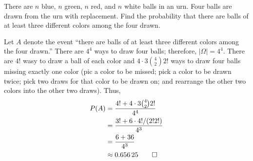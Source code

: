 \begin{problem}[Handout 2, \# 19]
  There are \(n\) blue, \(n\) green, \(n\) red, and \(n\) white balls in an
  urn. Four balls are drawn from the urn with replacement. Find the
  probability that there are balls of at least three different colors among
  the four drawn.
\end{problem}
\begin{solution*}
  Let \(A\) denote the event ``there are balls of at least three different
  colors among the four drawn.'' There are \(4^4\) ways to draw four balls;
  therefore, \(|\Omega|=4^4\). There are \(4!\) wasy to draw a ball of each
  color and \(4\cdot 3\binom{4}{2} 2!\) ways to draw four balls missing
  exactly one color (pic a color to be missed; pick a color to be drawn
  twice; pick two draws for that color to be drawn on; and rearrange the
  other two colors into the other two draws). Thus,
  \begin{align*}
    P(A)
    &=\frac{4!+4\cdot 3\binom{4}{2}2!}{4^4}\\
    &=\frac{3!+6\cdot 4!/(2!2!)}{4^3} \\
    &=\frac{6+36}{4^3}\\
    &\approx\num{0.65625}\qedhere
  \end{align*}
\end{solution*}

